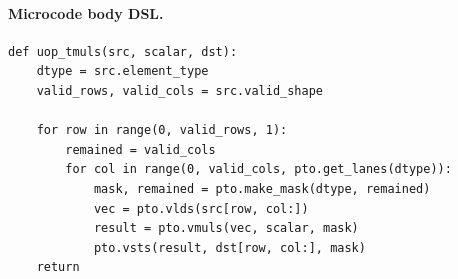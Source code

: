 \paragraph{Microcode body DSL.}
\begin{lstlisting}[style=ptocode]
def uop_tmuls(src, scalar, dst):
    dtype = src.element_type
    valid_rows, valid_cols = src.valid_shape

    for row in range(0, valid_rows, 1):
        remained = valid_cols
        for col in range(0, valid_cols, pto.get_lanes(dtype)):
            mask, remained = pto.make_mask(dtype, remained)
            vec = pto.vlds(src[row, col:])
            result = pto.vmuls(vec, scalar, mask)
            pto.vsts(result, dst[row, col:], mask)
    return
\end{lstlisting}
\Needspace{0.34\textheight}
